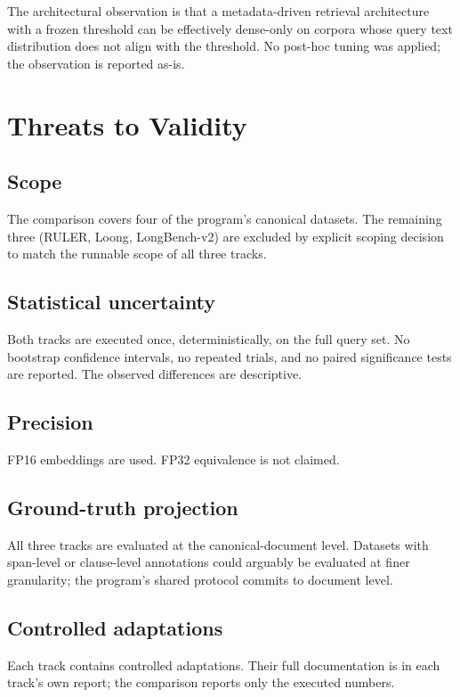 \documentclass[11pt,a4paper]{article}
\begin{document}
The architectural observation is that a metadata-driven retrieval
architecture with a frozen threshold can be effectively dense-only
on corpora whose query text distribution does not align with the
threshold. No post-hoc tuning was applied; the observation is
reported as-is.

\section{Threats to Validity}\label{sec:threats}

\subsection{Scope}
The comparison covers four of the program's canonical datasets. The
remaining three (RULER, Loong, LongBench-v2) are excluded by
explicit scoping decision to match the runnable scope of all three
tracks.

\subsection{Statistical uncertainty}
Both tracks are executed once, deterministically, on the full query
set. No bootstrap confidence intervals, no repeated trials, and no
paired significance tests are reported. The observed differences are
descriptive.

\subsection{Precision}
FP16 embeddings are used. FP32 equivalence is not claimed.

\subsection{Ground-truth projection}
All three tracks are evaluated at the canonical-document level.
Datasets with span-level or clause-level annotations could arguably
be evaluated at finer granularity; the program's shared protocol
commits to document level.

\subsection{Controlled adaptations}
Each track contains controlled adaptations. Their full documentation
is in each track's own report; the comparison reports only the
executed numbers.
\end{document}
